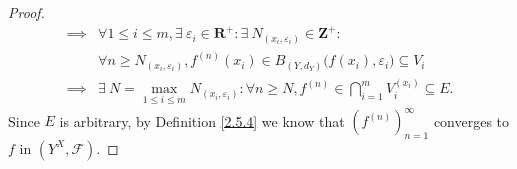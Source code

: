 \begin{proof}
\begin{align*}
        \implies & \forall 1 \leq i \leq m, \exists\ \varepsilon_i \in \mathbf{R}^+ : \exists\ N_{(x_i, \varepsilon_i)} \in \mathbf{Z}^+ :                                                           \\
                 & \forall n \geq N_{(x_i, \varepsilon_i)}, f^{(n)}(x_i) \in B_{(Y, d_Y)}\big(f(x_i), \varepsilon_i\big) \subseteq V_i                                                               \\
        \implies & \exists\ N = \max_{1 \leq i \leq m} N_{(x_i, \varepsilon_i)} : \forall n \geq N, f^{(n)} \in \bigcap_{i = 1}^m V_i^{(x_i)} \subseteq E.
    \end{align*}
    Since \(E\) is arbitrary, by Definition \ref{2.5.4} we know that \((f^{(n)})_{n = 1}^\infty\) converges to \(f\) in \((Y^X, \mathcal{F})\).
\end{proof}